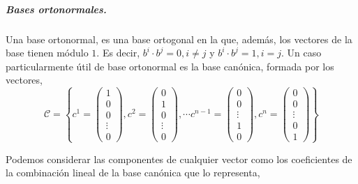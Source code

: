  \subparagraph{Bases ortonormales.} Una base ortonormal, es una base ortogonal en la que, además, los vectores de la base tienen módulo $1$. Es decir, $b^i\cdot b^j=0, i\neq j$ y  $b^i\cdot b^j=1, i = j$. Un caso particularmente útil de base ortonormal es la base canónica, formada por los vectores, 
\begin{equation*}
\mathcal{C}=\left\lbrace c^1=\begin{pmatrix}
1\\
0\\
0\\
\vdots \\
0
\end{pmatrix}, c^2=\begin{pmatrix}
0\\
1\\
0\\
\vdots \\
0
\end{pmatrix},
\cdots
c^{n-1}=\begin{pmatrix}
0\\
0\\
\vdots \\
1\\
0
\end{pmatrix},
c^n=\begin{pmatrix}
0\\
0\\
\vdots \\
0\\
1
\end{pmatrix} \right\rbrace
\end{equation*} 

Podemos considerar las componentes de cualquier vector como los coeficientes de la combinación lineal de la base canónica que lo representa,

